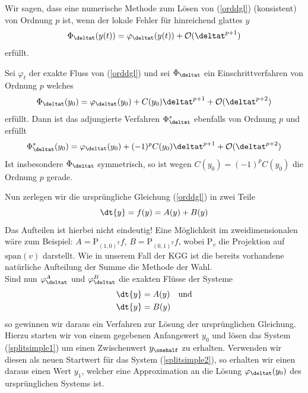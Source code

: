\begin{mathdef}[Konsistenzordnung]
Wir sagen, dass eine numerische Methode zum Lösen von (\ref{orddgl}) (konsistent) von Ordnung $p$ ist, wenn der lokale Fehler für hinreichend glattes $y$
\[\Phi_{\deltat}(y(t))=\varphi_{\deltat}(y(t))+\mathcal{O}(\deltat^{p+1})\] erfüllt.
\end{mathdef}
\begin{maththeorem}
\label{adjfloworder}
Sei $\varphi_t$ der exakte Fluss von (\ref{orddgl}) und sei $\Phi_{\deltat}$ ein Einschrittverfahren von Ordnung $p$ welches 
\[\Phi_{\deltat}(y_0)=\varphi_{\deltat}(y_0)+C(y_0)\deltat^{p+1}+\mathcal{O}(\deltat^{p+2})\]
erfüllt. Dann ist das adjungierte Verfahren $\Phi_{\deltat}^*$ ebenfalls von Ordnung $p$ und erfüllt
\[\Phi_{\deltat}^*(y_0)=\varphi_{\deltat}(y_0)+(-1)^{p}C(y_0)\deltat^{p+1}+\mathcal{O}(\deltat^{p+2})\]
Ist insbesondere $\Phi_{\deltat}$ symmetrisch, so ist wegen $C(y_0)=(-1)^pC(y_0)$ die Ordnung $p$ gerade.
\end{maththeorem}
Nun zerlegen wir die ursprüngliche Gleichung (\ref{orddgl}) in zwei Teile
\[\dt{y}=f(y)=A(y)+B(y) \]
Das Aufteilen ist hierbei nicht eindeutig! Eine Möglichkeit im zweidimensionalen wäre zum Beispiel: $A=\text{P}_{(1,0)^T}f,\,B=\text{P}_{(0,1)^T}f$, wobei $\text{P}_v$ die Projektion auf $\text{span}(v)$ darstellt. Wie in unserem Fall der KGG ist die bereits vorhandene natürliche Aufteilung der Summe die Methode der Wahl.\\
Sind nun $\varphi_{\deltat}^A$ und $\varphi_{\deltat}^B$ die exakten Flüsse der Systeme
\begin{align}
\dt{y}&=A(y)\quad \text{und} \label{splitsimple1}\\ 
\dt{y}&=B(y) \label{splitsimple2}
\end{align}
so gewinnen wir daraus ein Verfahren zur Lösung der ursprünglichen Gleichung.\\
Hierzu starten wir von einem gegebenen Anfangswert $y_0$ und lösen das System (\ref{splitsimple1}) um einen Zwischenwert $y_{\onehalf}$ zu erhalten. Verwenden wir diesen als neuen Startwert für das System (\ref{splitsimple2}), so erhalten wir einen daraus einen Wert $y_1$, welcher eine Approximation an die Lösung $\varphi_{\deltat}(y_0)$ des ursprünglichen Systems ist.\\[1cm]
\noindent\begin{minipage}{0.3\textwidth}


\end{minipage}%
